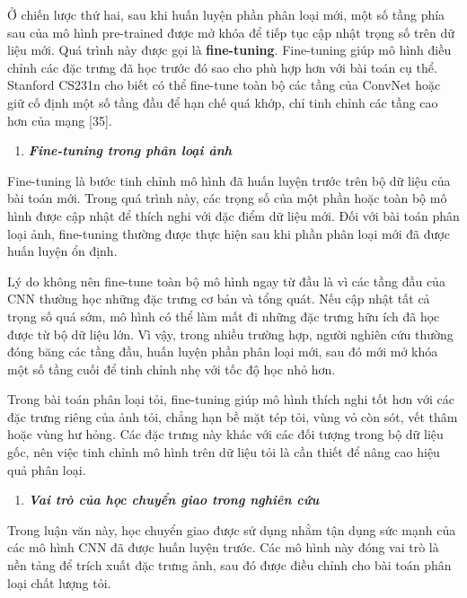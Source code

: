 \documentclass[
]{article}
\begin{document}
Ở chiến lược thứ hai, sau khi huấn luyện phần phân loại mới, một số tầng
phía sau của mô hình pre-trained được mở khóa để tiếp tục cập nhật trọng
số trên dữ liệu mới. Quá trình này được gọi là \textbf{fine-tuning}.
Fine-tuning giúp mô hình điều chỉnh các đặc trưng đã học trước đó sao
cho phù hợp hơn với bài toán cụ thể. Stanford CS231n cho biết có thể
fine-tune toàn bộ các tầng của ConvNet hoặc giữ cố định một số tầng đầu
để hạn chế quá khớp, chỉ tinh chỉnh các tầng cao hơn của mạng {[}35{]}.

\begin{enumerate}
\def\labelenumi{\arabic{enumi}.}
\setcounter{enumi}{3}
\item
  \protect{}\label{_Toc232112015}{}\emph{\textbf{Fine-tuning
  trong phân loại ảnh}}
\end{enumerate}

Fine-tuning là bước tinh chỉnh mô hình đã huấn luyện trước trên bộ dữ
liệu của bài toán mới. Trong quá trình này, các trọng số của một phần
hoặc toàn bộ mô hình được cập nhật để thích nghi với đặc điểm dữ liệu
mới. Đối với bài toán phân loại ảnh, fine-tuning thường được thực hiện
sau khi phần phân loại mới đã được huấn luyện ổn định.

Lý do không nên fine-tune toàn bộ mô hình ngay từ đầu là vì các tầng đầu
của CNN thường học những đặc trưng cơ bản và tổng quát. Nếu cập nhật tất
cả trọng số quá sớm, mô hình có thể làm mất đi những đặc trưng hữu ích
đã học được từ bộ dữ liệu lớn. Vì vậy, trong nhiều trường hợp, người
nghiên cứu thường đóng băng các tầng đầu, huấn luyện phần phân loại mới,
sau đó mới mở khóa một số tầng cuối để tinh chỉnh nhẹ với tốc độ học nhỏ
hơn.

Trong bài toán phân loại tỏi, fine-tuning giúp mô hình thích nghi tốt
hơn với các đặc trưng riêng của ảnh tỏi, chẳng hạn bề mặt tép tỏi, vùng
vỏ còn sót, vết thâm hoặc vùng hư hỏng. Các đặc trưng này khác với các
đối tượng trong bộ dữ liệu gốc, nên việc tinh chỉnh mô hình trên dữ liệu
tỏi là cần thiết để nâng cao hiệu quả phân loại.

\begin{enumerate}
\def\labelenumi{\arabic{enumi}.}
\setcounter{enumi}{4}
\item
  \protect{}\label{_Toc232112016}{}\emph{\textbf{Vai trò
  của học chuyển giao trong nghiên cứu}}
\end{enumerate}

Trong luận văn này, học chuyển giao được sử dụng nhằm tận dụng sức mạnh
của các mô hình CNN đã được huấn luyện trước. Các mô hình này đóng vai
trò là nền tảng để trích xuất đặc trưng ảnh, sau đó được điều chỉnh cho
bài toán phân loại chất lượng tỏi.
\end{document}

